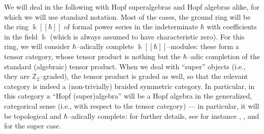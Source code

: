 \documentclass[12pt,reqno,twoside,a4paper]{amsart}
\numberwithin{equation}{section}
\theoremstyle{definition}
\newtheorem{free text}[lema]{}
\theoremstyle{remark}
\def \ZZ {\mathbb{Z}}
\def \k {\Bbbk}
\def \kh{{\Bbbk[[\hbar]]}}
\theoremstyle{plain}
\begin{document}
   We will deal in the following with Hopf superalgebras and Hopf algebras alike, for which we
   will use standard notation.  Most of the cases, the ground ring will be the ring  $ \kh $  of
   formal power series in the indeterminate  $ \hbar $  with coefficients in the field  $ \k $
   (which is always assumed to have characteristic zero).  For this ring, we will consider
   $ \hbar $--adically  complete  $ \kh $--modules:  these form a tensor category, whose tensor
   product is nothing but the  $ \hbar $--adic  completion of the standard (algebraic) tensor
   product.  When we deal with ``super'' objects (i.e., they are  $ \ZZ_2 $--graded),  the tensor
   product is graded as well, so that the relevant category is indeed a (non-trivially) braided
   symmetric category.  In particular, in this category a ``Hopf (super)algebra''
   will be a Hopf algebra in the generalized, categorical sense
   (i.e., with respect to the tensor category)
   --- in particular, it will be topological and  $ \hbar $--adically  complete:
     for further details, see for instance  \cite{CP},  \cite{KS},  and  \cite{Ge1}  for the super case.

\vskip9pt
\end{document}

